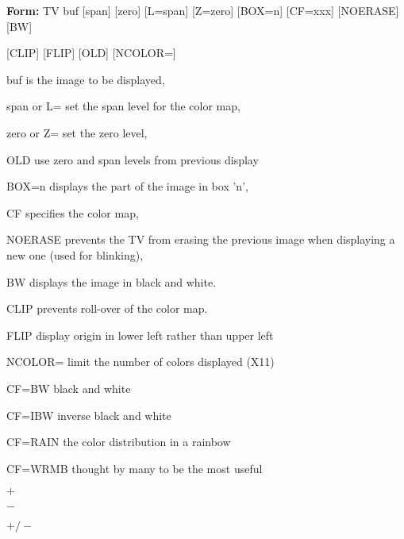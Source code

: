 {\newpage\clearpage
{}%
\begin{command}
  \item[\textbf{Form: }TV buf {[span]} {[zero]} {[L=span]} {[Z=zero]} 
       {[BOX=n]} {[CF=xxx]} {[NOERASE]} {[BW]}\hfill]{}
  \item[{[CLIP]} {[FLIP]} {[OLD]} {[NCOLOR=]}\hfill]{}
  \item[buf]{is the image to be displayed,}
  \item[span or L=]{set the span level for the color map,}
  \item[zero or Z=]{set the zero level,}
  \item[OLD]{use zero and span levels from previous display}
  \item[BOX=n]{displays the part of the image in box 'n',}
  \item[CF]{specifies the color map,}
  \item[NOERASE]{prevents the TV from erasing the previous image
       when displaying a new one (used for blinking),}
  \item[BW]{displays the image in black and white.}
  \item[CLIP]{prevents roll-over of the color map.}
  \item[FLIP]{display origin in lower left rather than upper left}
  \item[NCOLOR=]{limit the number of colors displayed (X11)}
\end{command}%
\lthtmlfigureZ
\lthtmlcheckvsize\clearpage}

{\newpage\clearpage
{}%
\begin{example}
  \item[CF=BW\hfill]{black and white}
  \item[CF=IBW\hfill]{inverse black and white}
  \item[CF=RAIN\hfill]{the color distribution in a rainbow}
  \item[CF=WRMB\hfill]{thought by many to be the most useful}
\end{example}%
\lthtmlfigureZ
\lthtmlcheckvsize\clearpage}

{\newpage\clearpage
{}%
$+$%
\lthtmlinlinemathZ
\lthtmlcheckvsize\clearpage}

{\newpage\clearpage
{}%
$-$%
\lthtmlinlinemathZ
\lthtmlcheckvsize\clearpage}

{\newpage\clearpage
{}%
$+/-$%
\lthtmlinlinemathZ
\lthtmlcheckvsize\clearpage}

